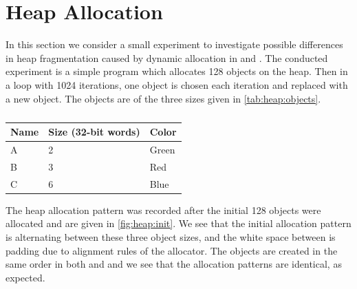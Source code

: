 \section{Heap Allocation}
\label{sec:res:heap}
In this section we consider a small experiment to investigate possible differences in heap fragmentation caused by dynamic allocation in {\C} and {\rust}.
The conducted experiment is a simple program which allocates 128 objects on the heap.
Then in a loop with 1024 iterations, one object is chosen each iteration and replaced with a new object.
The objects are of the three sizes given in \autoref{tab:heap:objects}.

\begin{table}[H]
  \centering
  \begin{tabular}{l|l|l}
    \textbf{Name} & \textbf{Size (32-bit words)} & \textbf{Color} \\
    \hline
    A & 2 & Green \\
    B & 3 & Red \\
    C & 6 & Blue \\
    \hline
  \end{tabular}
  \caption{}
  \label{tab:heap:objects}
\end{table}

The heap allocation pattern was recorded after the initial 128 objects were allocated and are given in \autoref{fig:heap:init}.
We see that the initial allocation pattern is alternating between these three object sizes, and the white space between is padding due to alignment rules of the allocator.
The objects are created in the same order in both {\C} and {\rust} and we see that the allocation patterns are identical, as expected.

